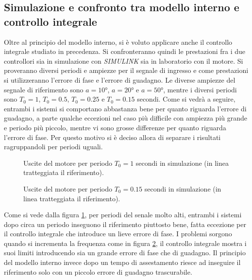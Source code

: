 	
	\subsection{Simulazione e confronto tra modello interno e controllo integrale}
	\label{subsec:SimInterno}
	
		Oltre al principio del modello interno, si è voluto applicare anche il controllo integrale studiato in precedenza. Si confronteranno quindi le prestazioni fra i due controllori sia in simulazione con \textit{SIMULINK} sia in laboratorio con il motore. Si proveranno diversi periodi e ampiezze per il segnale di ingresso e come prestazioni si utilizzeranno l'errore di fase e l'errore di guadagno. Le diverse ampiezze del segnale di riferimento sono $a=10°$, $a=20°$ e $a=50°$, mentre i diversi periodi sono $T_0=1$, $T_0=0.5$, $T_0=0.25$ e $T_0=0.15$ secondi. Come si vedrà a seguire, entrambi i sistemi si comportano abbastanza bene per quanto riguarda l'errore di guadagno, a parte qualche eccezioni nel caso più difficile con ampiezza più grande e periodo più piccolo, mentre vi sono grosse differenze per quanto riguarda l'errore di fase. Per questo motivo si è deciso allora di separare i risultati ragruppandoli per periodi uguali.
		
		\begin{figure}[H]
			\centering
			
			\caption{Uscite del motore per periodo $T_0=1$ secondi in simulazione (in linea tratteggiata il riferimento).} 
			\label{fig:simLowerBound}		
		\end{figure}		 
		
		\begin{figure}[H]
			\centering
			 
			\caption{Uscite del motore per periodo $T_0=0.15$ secondi in simulazione (in linea tratteggiata il riferimento).}
			\label{fig:simUpperBound}		
		\end{figure}
		
		\noindent Come si vede dalla figura \ref{fig:simLowerBound}, per periodi del senale molto alti, entrambi i sistemi dopo circa un periodo inseguono il riferimento piuttosto bene, fatta eccezione per il controllo integrale che introduce un lieve errore di fase. I problemi  sorgono quando si incrementa la frequenza come in figura \ref{fig:simUpperBound}, il controllo integrale mostra i suoi limiti introducendo sia un grande errore di fase che di guadagno. Il principio del modello interno invece dopo un tempo di assestamento riesce ad inseguire il riferimento solo con un piccolo errore di guadagno trascurabile.	
		
